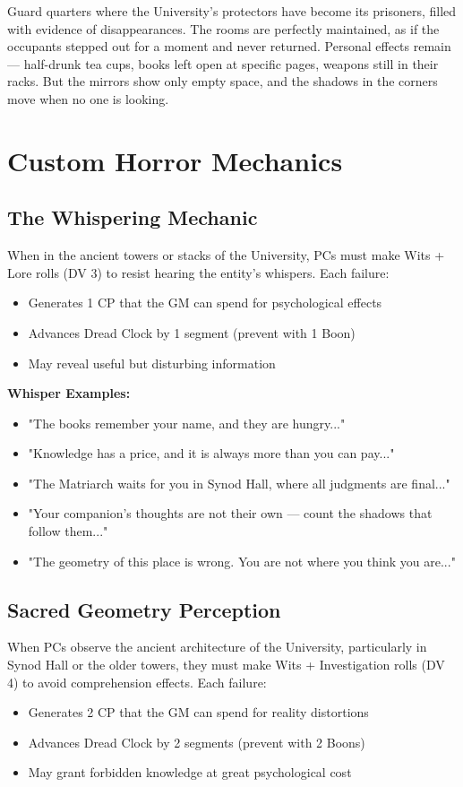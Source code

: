 \documentclass[11pt]{article}
\begin{document}
Guard quarters where the University's protectors have become its prisoners, filled with evidence of disappearances. The rooms are perfectly maintained, as if the occupants stepped out for a moment and never returned. Personal effects remain — half-drunk tea cups, books left open at specific pages, weapons still in their racks. But the mirrors show only empty space, and the shadows in the corners move when no one is looking.

\section{Custom Horror Mechanics}

\subsection{The Whispering Mechanic}

When in the ancient towers or stacks of the University, PCs must make Wits + Lore rolls (DV 3) to resist hearing the entity's whispers. Each failure:
\begin{itemize}
\item Generates 1 CP that the GM can spend for psychological effects
\item Advances Dread Clock by 1 segment (prevent with 1 Boon)
\item May reveal useful but disturbing information
\end{itemize}

\textbf{Whisper Examples:}
\begin{itemize}
\item "The books remember your name, and they are hungry..."
\item "Knowledge has a price, and it is always more than you can pay..."
\item "The Matriarch waits for you in Synod Hall, where all judgments are final..."
\item "Your companion's thoughts are not their own — count the shadows that follow them..."
\item "The geometry of this place is wrong. You are not where you think you are..."
\end{itemize}

\subsection{Sacred Geometry Perception}

When PCs observe the ancient architecture of the University, particularly in Synod Hall or the older towers, they must make Wits + Investigation rolls (DV 4) to avoid comprehension effects. Each failure:
\begin{itemize}
\item Generates 2 CP that the GM can spend for reality distortions
\item Advances Dread Clock by 2 segments (prevent with 2 Boons)
\item May grant forbidden knowledge at great psychological cost
\end{itemize}
\end{document}
